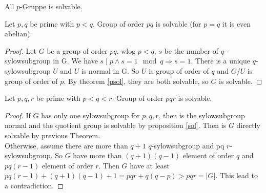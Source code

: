 \begin{theorem}\label{psol}
    All \(p\)-Gruppe is solvable.
\end{theorem}

\begin{theorem}
    Let \(p,q\) be prime with \(p<q\). Group of order \(pq\) is solvable (for \(p = q\) it is even abelian).
\end{theorem}

\begin{proof}
    Let \(G\) be a group of order \(pq\), wlog \(p < q\), \(s\) be the number of \(q\)-sylowsubgroup in G. We have \(s \mid p \wedge s = 1 \mod q \Rightarrow s = 1\). There is a unique \(q\)-sylowsubgroup \(U\) and \(U\) is normal in G. So \(U\) is group of order of \(q\) and \(G/U\) is group of order of \(p\). By theorem \ref{psol}, they are both solvable, so \(G\) is solvable.
\end{proof}

\begin{theorem}
    Let \(p,q,r\) be prime with \(p<q<r\). Group of order \(pqr\) is solvable.
\end{theorem}

\begin{proof}
    If \(G\) has only one sylowsubgroup for \(p,q,r\), then is the sylowsubgroup normal and the quotient group is solvable by proposition \ref{sol}. Then is \(G\) directly solvable by previous Theorem.\\
    Otherwise, assume there are more than \(q+1\)  \(q\)-sylowsubgroup and pq \(r\)-sylowsubgroup. So \(G\) have more than \((q+1)(q-1)\) element of order \(q\) and \(pq(r-1)\) element of order \(r\). Then \(G\) have at least \(pq(r-1)+(q+1)(q-1)+1 = pqr + q(q-p) > pqr = |G|\). This lead to a contradiction.
\end{proof}
